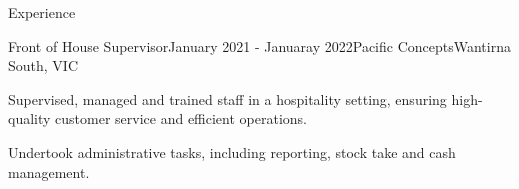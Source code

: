 \documentclass[
	11pt, %
]{resume} %
\begin{document}
\begin{rSection}{Experience}

	\begin{rSubsection}{Front of House Supervisor}{January 2021 - Januaray 2022}{Pacific Concepts}{Wantirna South, VIC}
		\item Supervised, managed and trained staff in a hospitality setting, ensuring high-quality customer service and efficient operations.
		\item Undertook administrative tasks, including reporting, stock take and cash management.
	\end{rSubsection}

\end{rSection}






\end{document}
